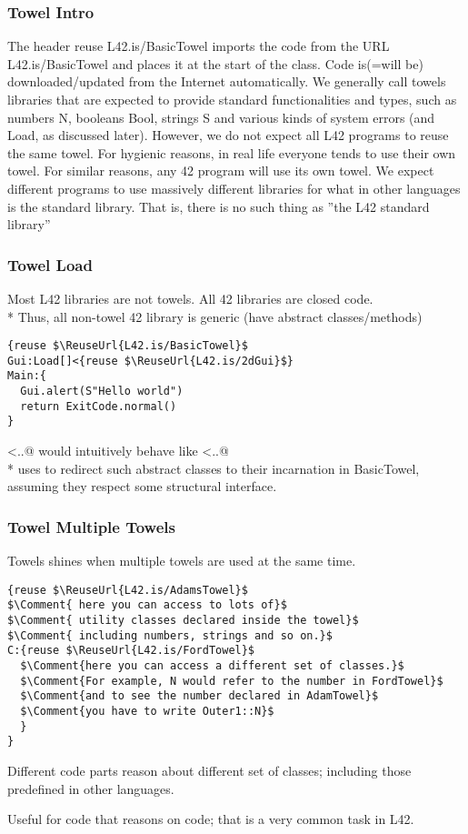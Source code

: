 \begin{frame}[fragile]
\frametitle{Towel Intro}
The header reuse L42.is/BasicTowel imports the code from 
the URL L42.is/BasicTowel and places it at the start of the class.
Code is(=will be) downloaded/updated from the Internet automatically.
We generally call towels libraries that are expected to provide standard
functionalities and types, such as numbers N, booleans Bool,
strings S and various kinds of system errors
(and Load, as discussed later).
However, we do not expect all L42 programs to reuse the same towel.
For hygienic reasons, in real life everyone tends to use their own towel.
For similar reasons, any 42 program will use its own towel.
We expect different programs to use massively different libraries for
what in other languages is the standard library.
That is, there is no such thing as ''the L42 standard library''
\end{frame}
\begin{frame}[fragile]
\frametitle{Towel Load}


Most L42 libraries are not towels.
All 42 libraries are closed code.
\\*
Thus, all non-towel 42 library is generic
(have abstract classes/methods)

\begin{NiceCode}{59ex}{1}
\begin{lstlisting}
{reuse $\ReuseUrl{L42.is/BasicTowel}$
Gui:Load[]<{reuse $\ReuseUrl{L42.is/2dGui}$}
Main:{
  Gui.alert(S"Hello world")
  return ExitCode.normal()
}
\end{lstlisting}
\end{NiceCode}
\Q@Load[]<{..}@
would intuitively behave like 
<{..}@\\*
\Q@Load@ uses \Q@Adapt@ to redirect such abstract classes to their incarnation in BasicTowel,
assuming they respect some structural interface.

\end{frame}
\begin{frame}[fragile]
\frametitle{Towel Multiple Towels}

Towels shines when multiple towels are used at the same time.

\begin{NiceCode}{59ex}{1}
\begin{lstlisting}
{reuse $\ReuseUrl{L42.is/AdamsTowel}$
$\Comment{ here you can access to lots of}$
$\Comment{ utility classes declared inside the towel}$
$\Comment{ including numbers, strings and so on.}$
C:{reuse $\ReuseUrl{L42.is/FordTowel}$
  $\Comment{here you can access a different set of classes.}$
  $\Comment{For example, N would refer to the number in FordTowel}$
  $\Comment{and to see the number declared in AdamTowel}$
  $\Comment{you have to write Outer1::N}$
  }
}
\end{lstlisting}
\end{NiceCode}

Different code parts reason about different set of classes;
including those predefined in other languages.

Useful for code that reasons on code; that is a very common task
in L42. 


\end{frame}

